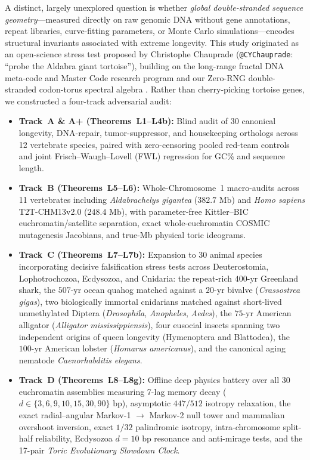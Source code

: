 \documentclass[11pt,a4paper]{article}
\renewcommand{\_}{\origunderscore\penalty200\relax}
\theoremstyle{remark}
\begin{document}
A distinct, largely unexplored question is whether \emph{global double-stranded sequence geometry}---measured directly on raw genomic DNA without gene annotations, repeat libraries, curve-fitting parameters, or Monte Carlo simulations---encodes structural invariants associated with extreme longevity.
This study originated as an open-science stress test proposed by Christophe Chauprade (\texttt{@CY\_Chauprade}: ``probe the Aldabra giant tortoise''), building on the long-range fractal DNA meta-code and Master Code research program \cite{Perez1991,Perez1997,Perez2009,Perez2010,Perez2015,Perez2017,Perez2018,Perez2021,PerezMontagnier2021,Perez2022} and our Zero-RNG double-stranded codon-torus spectral algebra \cite{LogvinovichPerez2026a,LogvinovichPerez2026b}.
Rather than cherry-picking tortoise genes, we constructed a four-track adversarial audit:
\begin{itemize}
  \item \textbf{Track~A \& A+ (Theorems~L1--L4b):} Blind audit of 30 canonical longevity, DNA-repair, tumor-suppressor, and housekeeping orthologs across 12 vertebrate species, paired with zero-censoring pooled red-team controls and joint Frisch--Waugh--Lovell (FWL) regression for GC\% and sequence length.
  \item \textbf{Track~B (Theorems~L5--L6):} Whole-Chromosome~1 macro-audits across 11 vertebrates including \textit{Aldabrachelys gigantea} ($382.7\text{ Mb}$) and \textit{Homo sapiens} T2T-CHM13v2.0 ($248.4\text{ Mb}$), with parameter-free Kittler--BIC euchromatin/satellite separation, exact whole-euchromatin COSMIC mutagenesis Jacobians, and true-Mb physical toric ideograms.
  \item \textbf{Track~C (Theorems~L7--L7b):} Expansion to 30 animal species incorporating decisive falsification stress tests across Deuterostomia, Lophotrochozoa, Ecdysozoa, and Cnidaria: the repeat-rich $400\text{-yr}$ Greenland shark, the $507\text{-yr}$ ocean quahog matched against a $20\text{-yr}$ bivalve (\textit{Crassostrea gigas}), two biologically immortal cnidarians matched against short-lived unmethylated Diptera (\textit{Drosophila}, \textit{Anopheles}, \textit{Aedes}), the $75\text{-yr}$ American alligator (\textit{Alligator mississippiensis}), four eusocial insects spanning two independent origins of queen longevity (Hymenoptera and Blattodea), the $100\text{-yr}$ American lobster (\textit{Homarus americanus}), and the canonical aging nematode \textit{Caenorhabditis elegans}.
  \item \textbf{Track~D (Theorems~L8--L8g):} Offline deep physics battery over all 30 euchromatin assemblies measuring 7-lag memory decay ($d \in \{3,6,9,10,15,30,90\}\text{ bp}$), asymptotic $447/512$ isotropy relaxation, the exact radial--angular Markov-1 $\to$ Markov-2 null tower and mammalian overshoot inversion, exact $1/32$ palindromic isotropy, intra-chromosome split-half reliability, Ecdysozoa $d=10\text{ bp}$ resonance and anti-mirage tests, and the 17-pair \emph{Toric Evolutionary Slowdown Clock}.
\end{itemize}
\end{document}
